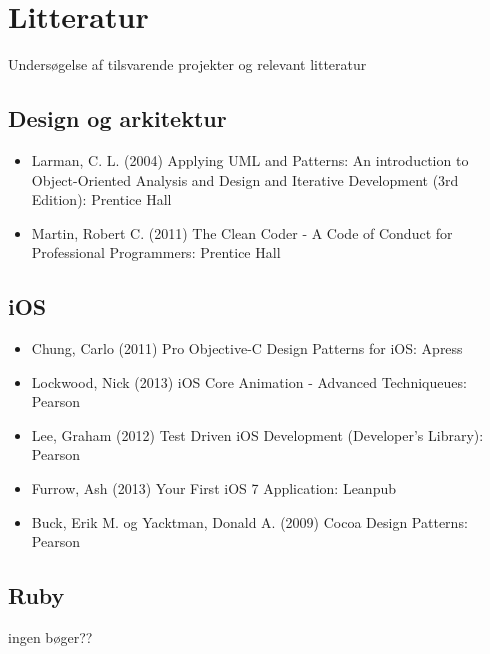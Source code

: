 \chapter{Litteratur}
Undersøgelse af tilsvarende projekter og relevant litteratur

\section{Design og arkitektur}
\begin{itemize}
\item Larman, C. L. (2004) Applying UML and Patterns: An introduction to Object-Oriented Analysis and Design and Iterative Development (3rd Edition): Prentice Hall

\item Martin, Robert C. (2011) The Clean Coder - A Code of Conduct for Professional Programmers: Prentice Hall
\end{itemize}
\section{iOS}
\begin{itemize}
\item Chung, Carlo (2011) Pro Objective-C Design Patterns for iOS: Apress

\item Lockwood, Nick (2013) iOS Core Animation - Advanced Techniqueues: Pearson

\item Lee, Graham (2012) Test Driven iOS Development (Developer’s Library): Pearson

\item Furrow, Ash (2013) Your First iOS 7 Application: Leanpub

\item Buck, Erik M. og Yacktman, Donald A. (2009) Cocoa Design Patterns: Pearson
\end{itemize}
\section{Ruby}
ingen bøger??
